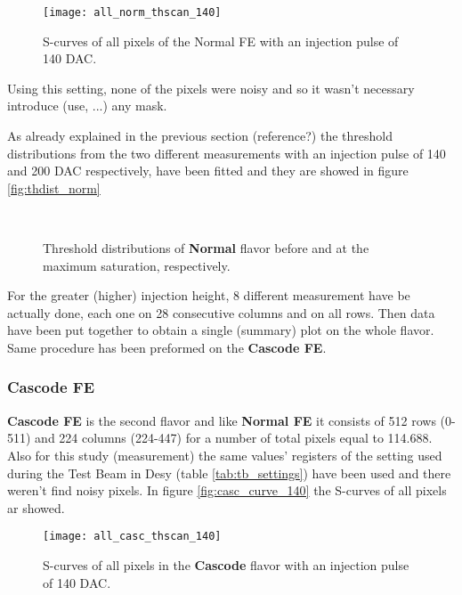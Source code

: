 \begin{figure}[h!]
\centering
\texttt{[image: all\_norm\_thscan\_140]}
\caption{S-curves of all pixels of the Normal FE with an injection pulse of 140 DAC.}
\label{fig:norm_scurve_140}
\end{figure}

Using this setting, none of the pixels were noisy and so it wasn't necessary introduce (use, ...) any mask.

As already explained in the previous section (reference?) the threshold distributions from the two different measurements with an injection pulse of 140 and 200 DAC respectively, have been fitted and they are showed in figure \vref{fig:thdist_norm}

\begin{figure}[h!]
\centering
{}\quad
{}\\
\caption{Threshold distributions of \textbf{Normal} flavor before and at the maximum saturation, respectively.}
\label{fig:thdist_norm}
\end{figure}
 
For the greater (higher) injection height, 8 different measurement have be actually done, each one on 28 consecutive columns and on all rows. Then data have been put together to obtain a single (summary) plot on the whole flavor. Same procedure has been preformed on the \textbf{Cascode FE}.


\subsubsection{Cascode FE}

\textbf{Cascode FE} is the second flavor and like \textbf{Normal FE} it consists of 512 rows (0-511) and 224 columns (224-447) for a number of total pixels equal to 114.688. Also for this study (measurement) the same values' registers of the setting used during the Test Beam in Desy (table \vref{tab:tb_settings}) have been used and there weren't find noisy pixels. 
In figure \vref{fig:casc_curve_140} the S-curves of all pixels ar showed.

\begin{figure}[h!]
\centering
\texttt{[image: all\_casc\_thscan\_140]}
\caption{S-curves of all pixels in the \textbf{Cascode} flavor with an injection pulse of 140 DAC.}
\label{fig:casc_scurve_140}
\end{figure}

